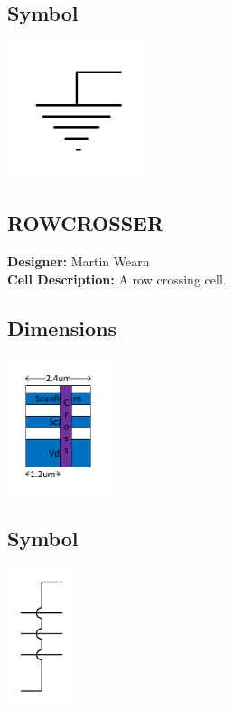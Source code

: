 \begin{multicols}{2}
\subsection*{Symbol}\includegraphics[width=\textwidth,height=4cm,keepaspectratio=true]{../tielow/symbol.pdf}
\end{multicols}

\subsection{ROWCROSSER} \makebox[\linewidth]{\rule{\textwidth}{0.4pt}}
{\bf Designer: } Martin Wearn\\
{\bf Cell Description: } A row crossing cell.\\
\begin{multicols}{2}
\subsection*{Dimensions}\includegraphics[width=\textwidth,height=4cm,keepaspectratio=true]{../rowcrosser/blackbox.pdf}
\subsection*{Symbol}\includegraphics[width=\textwidth,height=4cm,keepaspectratio=true]{../rowcrosser/symbol.pdf}
\end{multicols}
